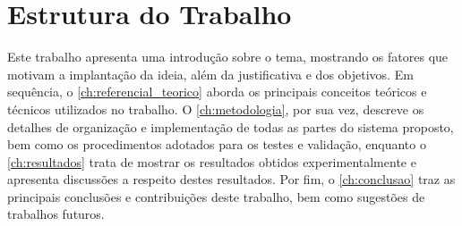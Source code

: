 \section{Estrutura do Trabalho}
\label{sec:estrutura_do_trabalho}
Este trabalho apresenta uma introdução sobre o tema, mostrando os fatores que motivam a implantação da ideia, além da justificativa e dos objetivos. Em sequência, o \autoref{ch:referencial_teorico} aborda os principais conceitos teóricos e técnicos utilizados no trabalho. O \autoref{ch:metodologia}, por sua vez, descreve os detalhes de organização e implementação de todas as partes do sistema proposto, bem como os procedimentos adotados para os testes e validação, enquanto o \autoref{ch:resultados} trata de mostrar os resultados obtidos experimentalmente e apresenta discussões a respeito destes resultados. Por fim, o \autoref{ch:conclusao} traz as principais conclusões e contribuições deste trabalho, bem como sugestões de trabalhos futuros.

